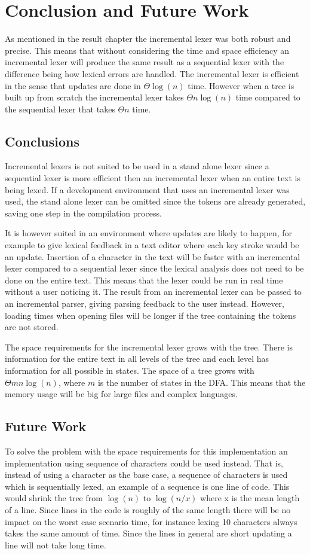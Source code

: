 \chapter{Conclusion and Future Work}
As mentioned in the result chapter the incremental lexer was both robust and
precise. This means that without considering the time and space efficiency an
incremental lexer will produce the same result as a sequential lexer with the
difference being how lexical errors are handled. The incremental lexer is
efficient in the sense that updates are done in $\Theta \log(n)$ time. However
when a tree is built up from scratch the incremental lexer takes
$\Theta n\log(n)$ time compared to the sequential lexer that takes $\Theta n$
time.

\section{Conclusions}
Incremental lexers is not suited to be used in a stand alone lexer since a
sequential lexer is more efficient then an incremental lexer when an entire text
is being lexed. If a development environment that uses an incremental lexer was
used, the stand alone lexer can be omitted since the tokens are already
generated, saving one step in the compilation process.

It is however suited in an environment where updates are likely to happen, for
example to give lexical feedback in a text editor where each key stroke would be
an update. Insertion of a character in the text will be faster with an
incremental lexer compared to a sequential lexer since the lexical analysis does
not need to be done on the entire text. This means that the lexer could be run
in real time without a user noticing it. The result from an incremental lexer
can be passed to an incremental parser, giving parsing feedback to the user
instead. However, loading times when opening files will be longer if the tree
containing the tokens are not stored.

The space requirements for the incremental lexer grows with the tree. There is
information for the entire text in all levels of the tree and each level has
information for all possible in states. The space of a tree grows with
$\Theta mn\log(n)$, where $m$ is the number of states in the DFA. This means
that the memory usage will be big for large files and complex languages.

\section{Future Work}
To solve the problem with the space requirements for this implementation an
implementation using sequence of characters could be used instead. That is,
instead of using a character as the base case, a sequence of characters is used
which is sequentially lexed, an example of a sequence is one line of code. This
would shrink the tree from $\log(n)$ to $\log(n/x)$ where x is the mean length
of a line. Since lines in the code is roughly of the same length there will be
no impact on the worst case scenario time, for instance lexing 10 characters
always takes the same amount of time. Since the lines in general are short
updating a line will not take long time.

